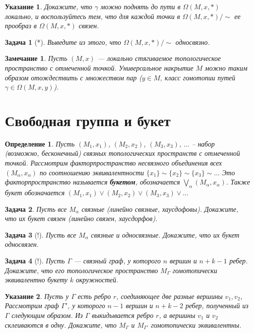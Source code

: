 \documentclass[12pt]{book}
\newcommand{\subs}{\section}
\theoremstyle{upshape}
\newtheorem{zadacha}{Задача}[chapter]
\theoremstyle{generic}
\newtheorem{opredelenie}[teorema]{Определение}
\theoremstyle{upshapenonumber}
\newtheorem{ukazanie}{Указание}[section]
\newtheorem{zamechanie}{Замечание}[chapter]
\newcommand{\следствие}{%
     \refstepcounter{teorema}
     {\noindent\bf Следствие \thechapter.\arabic{teorema}:\ }}
\newcommand{\пример}{%
     \refstepcounter{teorema}
     {\noindent\bf Пример \thechapter.\arabic{teorema}:\ }}
\newcommand{\лемма}{%
     \refstepcounter{teorema}
     {\noindent\bf Лемма \thechapter.\arabic{teorema}:\ }}
\newcommand{\теорема}{%
     \refstepcounter{teorema}
     {\noindent\bf Теорема \thechapter.\arabic{teorema}:\ }}
\newcommand{\утверждение}{%
     \refstepcounter{teorema}
     {\noindent\bf Утверждение \thechapter.\arabic{teorema}:\ }}
\begin{document}
{\begin{ukazanie}
Докажите, что $\gamma$ можно поднять до пути 
в $\Omega(M, x, *)$ локально, и воспользуйтесь
тем, что для каждой точки в $\Omega(M, x, *)/\sim$ ее
прообраз в $\Omega(M, x, *)$ связен.
\end{ukazanie}

\begin{zadacha}[*]
Выведите из этого, что $\Omega(M, x, *)/\sim$ односвязно.
\end{zadacha}

\begin{zamechanie}
Пусть $(M, x)$ --- локально стягиваемое топологическое
пространство с отмеченной точкой. 
Универсальное накрытие $M$ можно таким образом
отождествить с множеством пар ($y\in M$, класс гомотопии
путей $\gamma\in \Omega(M,x,y)$).
\end{zamechanie}

\subs{Свободная группа и букет}

\begin{opredelenie}
Пусть $(M_1, x_1)$, $(M_2, x_2)$, $(M_3, x_3)$, $\ldots$ --
набор (возможно, бесконечный) связных топологических
пространств с отмеченной точкой. Рассмотрим
факторпространство несвязного объединения всех 
$(M_\alpha, x_\alpha)$ по соотношению эквивалентности
$\{x_1\}\sim \{x_2\}\sim \{x_3\}\sim \dots$
Это факторпространство называется
{\bf букетом}, обозначается 
$\bigvee_\alpha (M_\alpha,x_\alpha)$.
Также букет обозначается 
$(M_1, x_1)\vee(M_2, x_2)\vee(M_3, x_3)\vee \dots$
\end{opredelenie}

\begin{zadacha} 
Пусть все $M_\alpha$ связные (линейно связные,
хаусдофовы). Докажите, что их букет связен (линейно 
связен, хаусдорфов).
\end{zadacha}

\begin{zadacha}[!]
Пусть все $M_\alpha$ связные и односвязные.
Докажите, что их букет односвязен.
\end{zadacha}

\begin{zadacha}[!]
Пусть $\Gamma$ --- связный граф, у которого $n$ вершин и
$n+k-1$ ребер. Докажите, что его топологическое
пространство $M_\Gamma$ гомотопически эквивалентно
букету $k$ окружностей.
\end{zadacha}

\begin{ukazanie} 
Пусть у $\Gamma$ есть ребро $r$, соединяющее две разные
вершины $v_1, v_2$,  Рассмотрим граф $\Gamma'$,
у которого $n-1$ вершин и $n+k-2$ ребер, полученный
из $\Gamma$ следующим образом. Из $\Gamma$
выкидывается ребро $r$, а вершины $v_1$ и $v_2$
склеиваются в одну. Докажите, что $M_\Gamma$
и $M_{\Gamma'}$ гомотопически эквивалентны.
\end{ukazanie}

}
\end{document}
